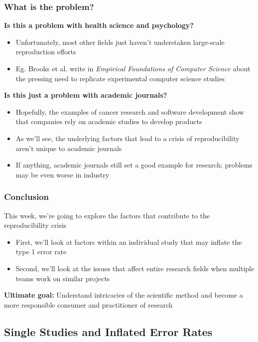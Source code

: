 \documentclass[10pt, block=fill]{beamer}
\begin{document}
\begin{frame}
  \frametitle{What is the problem?}
  
  \textbf{Is this a problem with health science and psychology?}
  \begin{itemize}
      \item Unfortunately, most other fields just haven't understaken large-scale reproduction efforts
      \item Eg. Brooks et al. write in \textit{Empirical Foundations of Computer Science} about the pressing need to replicate experimental computer science studies
  \end{itemize}
  
  \textbf{Is this just a problem with academic journals?}
  \begin{itemize}
      \item Hopefully, the examples of cancer research and software development show that companies rely on academic studies to develop products
      \item As we'll see, the underlying factors that lead to a crisis of reproducibility aren't unique to academic journals
      \item If anything, academic journals still set a good example for research; problems may be even worse in industry
  \end{itemize}
    
\end{frame}


\begin{frame}
  \frametitle{Conclusion}

This week, we're going to explore the factors that contribute to the reproducibility crisis

  \begin{itemize}
    \item First, we'll look at factors within an individual study that may inflate the type 1 error rate
    \item Second, we'll look at the issues that affect entire research fields when multiple teams work on similar projects
  \end{itemize}
  
  \textbf{Ultimate goal:} Understand intricacies of the scientific method and become a more responsible consumer and practitioner of research
\end{frame}



\subsection{Single Studies and Inflated Error Rates}
\end{document}
